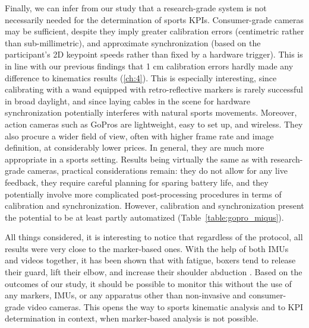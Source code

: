 Finally, we can infer from our study that a research-grade system is not necessarily needed for the determination of sports KPIs. Consumer-grade cameras may be sufficient, despite they imply greater calibration errors (centimetric rather than sub-millimetric), and approximate synchronization (based on the participant's 2D keypoint speeds rather than fixed by a hardware trigger). This is in line with our previous findings that 1 cm calibration errors hardly made any difference to kinematics results \cite{Pagnon2021} (\autoref{ch:4}). This is especially interesting, since calibrating with a wand equipped with retro-reflective markers is rarely successful in broad daylight, and since laying cables in the scene for hardware synchronization potentially interferes with natural sports movements. Moreover, action cameras such as GoPros are lightweight, easy to set up, and wireless. They also procure a wider field of view, often with higher frame rate and image definition, at considerably lower prices. In general, they are much more appropriate in a sports setting. Results being virtually the same as with research-grade cameras, practical considerations remain: they do not allow for any live feedback, they require careful planning for sparing battery life, and they potentially involve more complicated post-processing procedures in terms of calibration and synchronization. However, calibration and synchronization present the potential to be at least partly automatized (Table~\ref{table:gopro_miqus}).

All things considered, it is interesting to notice that regardless of the protocol, all results were very close to the marker-based ones. With the help of both IMUs and videos together, it has been shown that with fatigue, boxers tend to release their guard, lift their elbow, and increase their shoulder abduction \cite{Haralabidis2020}. Based on the outcomes of our study, it should be possible to monitor this without the use of any markers, IMUs, or any apparatus other than non-invasive and consumer-grade video cameras. This opens the way to sports kinematic analysis and to KPI determination in context, when marker-based analysis is not possible. 


